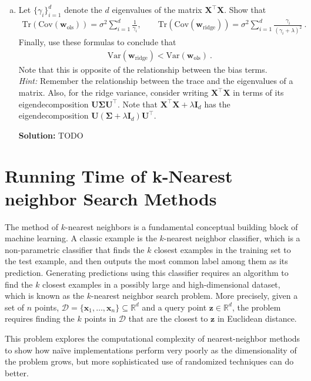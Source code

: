 \documentclass{article}
\newcommand{\Question}[1]{\Large \section{ #1 } \normalsize}
\newcommand{\mat}[1]{\mathbf{#1}}
\renewcommand{\vec}[1]{\boldsymbol{\mathbf{#1}}}
\newenvironment{solution}{\color{blue} \smallskip \textbf{Solution:}}{}
\begin{document}
\begin{enumerate}[(a)]
    \newpage
    \item 
    Let $\{\gamma_i\}_{i=1}^d$ denote the $d$ eigenvalues of the matrix $\mat{X}^\top\mat{X}$. Show that
    \begin{align*}
        \text{Tr}(\mathrm{Cov}(\vec{w}_{\text{ols}})) = \sigma^2 \sum_{i=1}^{d} \frac{1}{\gamma_i}, \qquad \text{Tr}(\mathrm{Cov}(\vec{w}_{\text{ridge}})) = \sigma^2 \sum_{i=1}^{d} \frac{\gamma_i}{(\gamma_i + \lambda)^2} \:.
    \end{align*}
    Finally, use these formulas to conclude that
    \begin{align*}
        \text{Var}(\vec{w}_{\text{ridge}}) < \text{Var}(\vec{w}_{\text{ols}}) \:.
    \end{align*}
    Note that this is opposite of the relationship between the bias terms. \\
    \textit{Hint:} Remember the relationship between the trace and the eigenvalues of a matrix. Also, for the ridge variance, consider writing $\mat{X}^\top\mat{X}$ in terms of its eigendecomposition $\mat{U} \mat{\Sigma} \mat{U}^\top$. Note that $\mat{X}^\top \mat{X} + \lambda \mat{I}_d$ has the eigendecomposition $\mat{U}(\mat{\Sigma} + \lambda \mat{I}_d)\mat{U}^\top$.
    
    \begin{solution}
        TODO
    \end{solution}
\end{enumerate}


\newpage
\Question{Running Time of k-Nearest neighbor Search Methods}

The method of $k$-nearest neighbors is a fundamental conceptual building block of machine learning. 
A classic example is the $k$-nearest neighbor classifier, which is a non-parametric classifier that finds the $k$ closest examples in the training set to the test example, and then outputs the most common label among them as its prediction. 
Generating predictions using this classifier requires an algorithm to find the $k$ closest examples in a possibly large and high-dimensional dataset, which is known as the $k$-nearest neighbor search problem. 
More precisely, given a set of $n$ points, $\mathcal{D} = \{\vec{x}_{1}, \ldots, \vec{x}_{n}\} \subseteq \mathbb{R}^{d}$ and a query point $\vec{z} \in \mathbb{R}^{d}$, the problem requires finding the $k$ points in $\mathcal{D}$ that are the closest to $\vec{z}$ in Euclidean distance.

This problem explores the computational complexity of nearest-neighbor methods to show how na\"{i}ve implementations perform very poorly as the dimensionality of the problem grows, but more sophisticated use of randomized techniques can do better. 
\end{document}
